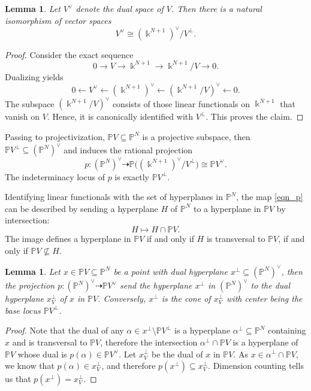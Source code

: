 \documentclass[12pt]{amsart}
\newcommand{\C}{\mathbb{C}} %
\newtheorem{lemma}[theorem]{Lemma}
\begin{document}
\begin{lemma}\label{lemma_V*and-quotient}
 Let $V^{\vee}$ denote the dual space of $V$. Then there is a natural isomorphism of vector spaces
  $$V^{\vee}\cong (\Bbbk^{N+1})^{\vee}/V^{\perp}.$$
\end{lemma}
\begin{proof}
    Consider the exact sequence 
$$0\to V\to \Bbbk^{N+1}\to \Bbbk^{N+1}/V\to 0.$$
Dualizing yields
    $$0\leftarrow   V^{\vee}\leftarrow  (\Bbbk^{N+1})^{\vee}\leftarrow   (\Bbbk^{N+1}/V)^{\vee}\leftarrow0.$$
The subspace $(\Bbbk^{N+1}/V)^{\vee}$ consists of those linear functionals on $\Bbbk^{N+1}$ that vanish on $V$. Hence, it is canonically identified with $V^{\perp}$. This proves the claim.
\end{proof}

Passing to projectivization, $\mathbb PV\subseteq \mathbb P^N$ is a projective subspace, then $\mathbb PV^{\perp}\subseteq (\mathbb P^N)^{\vee}$ and induces the rational projection
\begin{equation}\label{eqn_p}
    p: (\mathbb P^N)^{\vee}\dashrightarrow \mathbb P \big 
   ((\Bbbk^{N+1})^{\vee}/V^{\perp}\big )\cong \mathbb PV^{\vee}.
\end{equation}
The indeterminacy locus of $p$ is exactly $\mathbb PV^{\perp}$.

Identifying linear functionals with the set of hyperplanes in $\mathbb P^N$, the map \eqref{eqn_p} can be described by sending a hyperplane $H$ of $\mathbb P^N$ to a hyperplane in $\mathbb PV$ by intersection:
$$H\mapsto H\cap \mathbb PV.$$
The image defines a hyperplane in $\mathbb PV$ if and only if $H$ is transversal to $\mathbb PV$, if and only if $\mathbb PV\nsubseteq H$. 
\begin{lemma}\label{lmm_linear_PD}
    Let $x\in\mathbb{P} V\subseteq\mathbb{P}^N$ be a point with dual hyperplane $x^{\perp}\subseteq\left(\mathbb{P}^N\right)^{\vee}$, then the projection $p\colon\left(\mathbb{P}^N\right)^{\vee}\dashrightarrow\mathbb{P}V^{\vee}$ send the hyperplane $x^{\perp}$ in $(\mathbb P^N)^{\vee}$ to the dual hyperplane $x_V^{\perp}$ of $x$ in $\mathbb{P} V$. Conversely, $x^{\perp}$ is the cone of $x_V^{\perp}$ with center being the base locus $\mathbb PV^{\perp}$.
\end{lemma}
\begin{proof}
    Note that the dual of any $\alpha\in x^{\perp}\setminus\mathbb{P} V^{\perp}$ is a hyperplane $\alpha^{\perp}\subseteq\mathbb{P}^N$ containing $x$ and is transversal to $\mathbb{P}V$, therefore the intersection $\alpha^{\perp}\cap\mathbb{P}V$ is a hyperplane of $\mathbb{P}V$ whose dual is $p(\alpha)\in\mathbb{P}V^{\vee}$. Let $x_V^{\perp}$ be the dual of $x$ in $\mathbb{P}V$. As $x\in\alpha^{\perp}\cap\mathbb{P}V$, we know that $p(\alpha)\in x_V^{\perp}$, and therefore $p(x^{\perp})\subseteq x_V^{\perp}$. Dimension counting tells us that $p(x^{\perp})=x_V^{\perp}$.
\end{proof}
\end{document}
